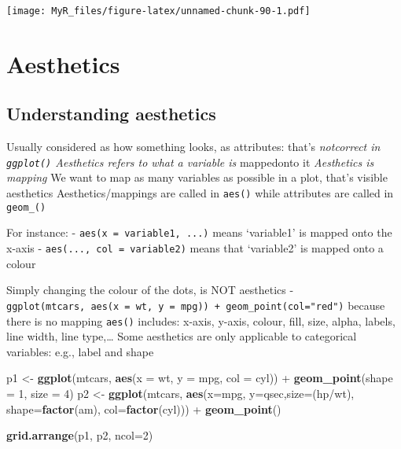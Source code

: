 \documentclass[]{book}
\newenvironment{Shaded}{}{}
\newcommand{\DataTypeTok}[1]{\textcolor[rgb]{0.56,0.13,0.00}{#1}}
\newcommand{\DecValTok}[1]{\textcolor[rgb]{0.25,0.63,0.44}{#1}}
\newcommand{\KeywordTok}[1]{\textcolor[rgb]{0.00,0.44,0.13}{\textbf{#1}}}
\newcommand{\NormalTok}[1]{#1}
\newcommand{\OperatorTok}[1]{\textcolor[rgb]{0.40,0.40,0.40}{#1}}
\newcommand{\StringTok}[1]{\textcolor[rgb]{0.25,0.44,0.63}{#1}}
\theoremstyle{definition}
\theoremstyle{definition}
\theoremstyle{definition}
\theoremstyle{remark}
\begin{document}
\texttt{[image: MyR\_files/figure-latex/unnamed-chunk-90-1.pdf]}

\hypertarget{aesthetics-1}{%
\section{Aesthetics}\label{aesthetics-1}}

\hypertarget{understanding-aesthetics}{%
\subsection{Understanding aesthetics}\label{understanding-aesthetics}}

Usually considered as how something looks, as attributes: that's
\emph{notcorrect in \texttt{ggplot()} Aesthetics refers to what a
variable is }mappedonto it \emph{Aesthetics is mapping} We want to map
as many variables as possible in a plot, that's visible aesthetics
Aesthetics/mappings are called in \texttt{aes()} while attributes are
called in \texttt{geom\_()}

For instance: - \texttt{aes(x\ =\ variable1,\ ...)} means `variable1' is
mapped onto the x-axis - \texttt{aes(...,\ col\ =\ variable2)} means
that `variable2' is mapped onto a colour

Simply changing the colour of the dots, is NOT aesthetics -
\texttt{ggplot(mtcars,\ aes(x\ =\ wt,\ y\ =\ mpg))\ +\ geom\_point(col="red")}
because there is no mapping \texttt{aes()} includes: x-axis, y-axis,
colour, fill, size, alpha, labels, line width, line type,\ldots{} Some
aesthetics are only applicable to categorical variables: e.g., label and
shape

\begin{Shaded}
\begin{Highlighting}[]
\NormalTok{p1 <-}\StringTok{ }\KeywordTok{ggplot}\NormalTok{(mtcars, }\KeywordTok{aes}\NormalTok{(}\DataTypeTok{x =}\NormalTok{ wt, }\DataTypeTok{y =}\NormalTok{ mpg, }\DataTypeTok{col =}\NormalTok{ cyl)) }\OperatorTok{+}
\StringTok{      }\KeywordTok{geom_point}\NormalTok{(}\DataTypeTok{shape =} \DecValTok{1}\NormalTok{, }\DataTypeTok{size =} \DecValTok{4}\NormalTok{)}
\NormalTok{p2 <-}\StringTok{ }\KeywordTok{ggplot}\NormalTok{(mtcars, }\KeywordTok{aes}\NormalTok{(}\DataTypeTok{x=}\NormalTok{mpg, }\DataTypeTok{y=}\NormalTok{qsec,}\DataTypeTok{size=}\NormalTok{(hp}\OperatorTok{/}\NormalTok{wt), }\DataTypeTok{shape=}\KeywordTok{factor}\NormalTok{(am), }\DataTypeTok{col=}\KeywordTok{factor}\NormalTok{(cyl))) }\OperatorTok{+}\StringTok{ }
\StringTok{      }\KeywordTok{geom_point}\NormalTok{()}

\KeywordTok{grid.arrange}\NormalTok{(p1, p2,  }\DataTypeTok{ncol=}\DecValTok{2}\NormalTok{)}
\end{Highlighting}
\end{Shaded}
\end{document}
